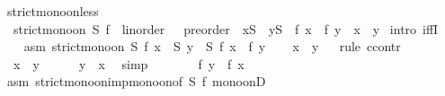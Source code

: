 \begin{isabellebody}
{}
\isamarkuptrue%
%
\endisatagdocument
{\isafolddocument}%
%
\isadelimdocument
%
\endisadelimdocument
{}\isamarkupfalse%
\ strict{\isacharunderscore}{\kern0pt}mono{\isacharunderscore}{\kern0pt}on{\isacharunderscore}{\kern0pt}less{\isacharcolon}{\kern0pt}\isanewline
\ \ {\isachardoublequoteopen}strict{\isacharunderscore}{\kern0pt}mono{\isacharunderscore}{\kern0pt}on\ S\ {\isacharparenleft}{\kern0pt}f{\isacharcolon}{\kern0pt}{\isacharcolon}{\kern0pt}\ {\isacharunderscore}{\kern0pt}\ {\isacharcolon}{\kern0pt}{\isacharcolon}{\kern0pt}linorder\ {\isasymRightarrow}\ {\isacharunderscore}{\kern0pt}\ {\isacharcolon}{\kern0pt}{\isacharcolon}{\kern0pt}preorder{\isacharparenright}{\kern0pt}\ {\isasymLongrightarrow}\ x{\isasymin}S\ {\isasymLongrightarrow}\ y{\isasymin}S\ {\isasymLongrightarrow}\ {\isacharparenleft}{\kern0pt}f\ x\ {\isacharless}{\kern0pt}\ f\ y{\isacharparenright}{\kern0pt}\ {\isacharequal}{\kern0pt}\ {\isacharparenleft}{\kern0pt}x\ {\isacharless}{\kern0pt}\ y{\isacharparenright}{\kern0pt}{\isachardoublequoteclose}\isanewline
%
\isadelimproof
%
\endisadelimproof
%
\isatagproof
{}\isamarkupfalse%
\ {\isacharparenleft}{\kern0pt}intro\ iffI{\isacharparenright}{\kern0pt}\isanewline
\ \ \isamarkupfalse%
\ asm{\isacharcolon}{\kern0pt}\ {\isachardoublequoteopen}strict{\isacharunderscore}{\kern0pt}mono{\isacharunderscore}{\kern0pt}on\ S\ f{\isachardoublequoteclose}\ {\isachardoublequoteopen}x\ {\isasymin}\ S{\isachardoublequoteclose}\ {\isachardoublequoteopen}y\ {\isasymin}\ S{\isachardoublequoteclose}\ {\isachardoublequoteopen}f\ x\ {\isacharless}{\kern0pt}\ f\ y{\isachardoublequoteclose}\isanewline
\ \ \isamarkupfalse%
\ {\isachardoublequoteopen}x\ {\isacharless}{\kern0pt}\ y{\isachardoublequoteclose}\isanewline
\ \ \isamarkupfalse%
{\isacharparenleft}{\kern0pt}rule\ ccontr{\isacharparenright}{\kern0pt}\isanewline
\ \ \ \ \isamarkupfalse%
\ {\isachardoublequoteopen}{\isasymnot}\ {\isacharparenleft}{\kern0pt}x\ {\isacharless}{\kern0pt}\ y{\isacharparenright}{\kern0pt}{\isachardoublequoteclose}\isanewline
\ \ \ \ \isamarkupfalse%
\ {\isachardoublequoteopen}y\ {\isasymle}\ x{\isachardoublequoteclose}\ \isamarkupfalse%
\ simp\isanewline
\ \ \ \ \isamarkupfalse%
\ \isamarkupfalse%
\ {\isachardoublequoteopen}f\ y\ {\isasymle}\ f\ x{\isachardoublequoteclose}\ \isamarkupfalse%
\ asm\ strict{\isacharunderscore}{\kern0pt}mono{\isacharunderscore}{\kern0pt}on{\isacharunderscore}{\kern0pt}imp{\isacharunderscore}{\kern0pt}mono{\isacharunderscore}{\kern0pt}on{\isacharbrackleft}{\kern0pt}of\ S\ f{\isacharbrackright}{\kern0pt}\ mono{\isacharunderscore}{\kern0pt}onD\ \isamarkupfalse%

\end{isabellebody}
